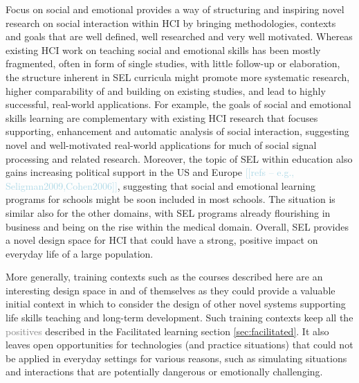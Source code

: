 \documentclass[prodmode,acmtochi]{acmsmall}
\newcommand{\todo}[1]{\textrm{\textrm{\textcolor{LightBlue}{[[#1]]}}}}
\newcommand{\rephrase}[1]{\textrm{\textrm{\textcolor{gray}{#1}}}}
\begin{document}
Focus on social and emotional provides a way of structuring and inspiring novel research on social interaction within HCI by bringing methodologies, contexts and goals that are well defined, well researched and very well motivated. Whereas existing HCI work on teaching social and emotional skills has been mostly fragmented, often in form of single studies, with little follow-up or elaboration, the structure inherent in SEL curricula might promote more systematic research, higher comparability of and building on existing studies, and lead to highly successful, real-world applications. 
%
For example, the goals of social and emotional skills learning are complementary with existing HCI research that focuses supporting, enhancement and automatic analysis of social interaction, suggesting novel and well-motivated real-world applications for much of social signal processing and related research. 
%
Moreover, the topic of SEL within education also gains increasing political support in the US and Europe \todo{refs -- e.g., Seligman2009,Cohen2006}, suggesting that social and emotional learning programs for schools might be soon included in most schools. The situation is similar also for the other domains, with SEL programs already flourishing in business and being on the rise within the medical domain. Overall, SEL provides a novel design space for HCI that could have a strong, positive impact on everyday life of a large population. 

More generally, training contexts such as the courses described here are an interesting design space in and of themselves as they could provide a valuable initial context in which to consider the design of other novel systems supporting life skills teaching and long-term development. Such training contexts keep all the \rephrase{positives} described in the Facilitated learning section \ref{sec:facilitated}. It also leaves open opportunities for technologies (and practice situations) that could not be applied in everyday settings for various reasons, such as simulating situations and interactions that are potentially dangerous or emotionally challenging.





\end{document}
